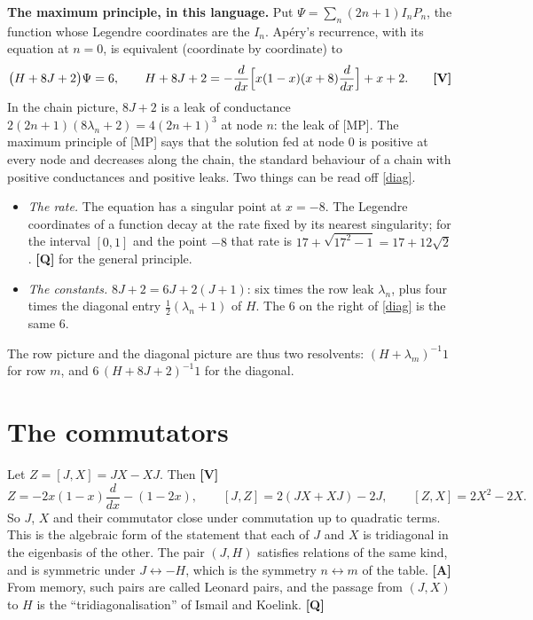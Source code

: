 \documentclass[11pt]{article}
\newcommand{\q}[1]{\medskip\noindent\textbf{#1}}
\begin{document}
\q{The maximum principle, in this language.} Put $\Psi=\sum_n(2n+1)I_nP_n$, the function whose
Legendre coordinates are the $I_n$. Ap\'ery's recurrence, with its equation at $n=0$, is
equivalent (coordinate by coordinate) to
\begin{equation}\label{diag}
\bigl(H+8J+2\bigr)\Psi=6,\qquad H+8J+2=-\frac d{dx}\Bigl[x(1-x)(x+8)\frac d{dx}\Bigr]+x+2 .
\qquad\textbf{[V]}
\end{equation}
In the chain picture, $8J+2$ is a leak of conductance $2(2n+1)(8\lambda_n+2)=4(2n+1)^3$ at node
$n$: the leak of [MP]. The maximum principle of [MP] says that the solution fed at node $0$ is
positive at every node and decreases along the chain, the standard behaviour of a chain with
positive conductances and positive leaks. Two things can be read off \eqref{diag}.
\begin{itemize}
\item \emph{The rate.} The equation has a singular point at $x=-8$. The Legendre coordinates of a
function decay at the rate fixed by its nearest singularity; for the interval $[0,1]$ and the
point $-8$ that rate is $17+\sqrt{17^2-1}=17+12\sqrt2$. \textbf{[Q]} for the general principle.
\item \emph{The constants.} $8J+2=6J+2(J+1)$: six times the row leak $\lambda_n$, plus four times
the diagonal entry $\frac12(\lambda_n+1)$ of $H$. The $6$ on the right of \eqref{diag} is the same
$6$.
\end{itemize}
The row picture and the diagonal picture are thus two resolvents: $(H+\lambda_m)^{-1}1$ for row
$m$, and $6\,(H+8J+2)^{-1}1$ for the diagonal.

\section{The commutators}

Let $Z=[J,X]=JX-XJ$. Then \textbf{[V]}
\[
Z=-2x(1-x)\frac d{dx}-(1-2x),\qquad [J,Z]=2(JX+XJ)-2J,\qquad [Z,X]=2X^2-2X .
\]
So $J$, $X$ and their commutator close under commutation up to quadratic terms. This is the
algebraic form of the statement that each of $J$ and $X$ is tridiagonal in the eigenbasis of the
other. The pair $(J,H)$ satisfies relations of the same kind, and is symmetric under
$J\leftrightarrow-H$, which is the symmetry $n\leftrightarrow m$ of the table. \textbf{[A]} From
memory, such pairs are called Leonard pairs, and the passage from $(J,X)$ to $H$ is the
``tridiagonalisation'' of Ismail and Koelink. \textbf{[Q]}
\end{document}
